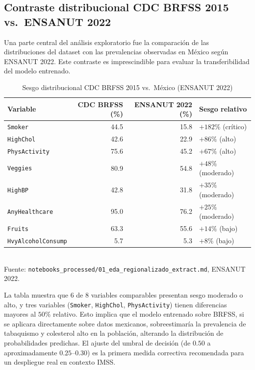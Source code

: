 \documentclass[12pt,a4paper]{article}
\begin{document}
\subsection{Contraste distribucional CDC BRFSS 2015 vs.\ ENSANUT 2022}

Una parte central del análisis exploratorio fue la comparación de las distribuciones del dataset con las prevalencias observadas en México según ENSANUT 2022. Este contraste es imprescindible para evaluar la transferibilidad del modelo entrenado.

\begin{table}[H]
  \centering
  \caption{Sesgo distribucional CDC BRFSS 2015 vs.\ México (ENSANUT 2022)}
  \label{tab:sesgo}
  \begin{tabular}{lrrl}
    \toprule
    \textbf{Variable} & \textbf{CDC BRFSS (\%)} & \textbf{ENSANUT 2022 (\%)} & \textbf{Sesgo relativo}\\
    \midrule
    \texttt{Smoker} & 44.5 & 15.8 & \textcolor{rojoAlerta}{$+182\%$ (crítico)}\\
    \texttt{HighChol} & 42.6 & 22.9 & \textcolor{rojoAlerta}{$+86\%$ (alto)}\\
    \texttt{PhysActivity} & 75.6 & 45.2 & \textcolor{rojoAlerta}{$+67\%$ (alto)}\\
    \texttt{Veggies} & 80.9 & 54.8 & $+48\%$ (moderado)\\
    \texttt{HighBP} & 42.8 & 31.8 & $+35\%$ (moderado)\\
    \texttt{AnyHealthcare} & 95.0 & 76.2 & $+25\%$ (moderado)\\
    \texttt{Fruits} & 63.3 & 55.6 & $+14\%$ (bajo)\\
    \texttt{HvyAlcoholConsump} & 5.7 & 5.3 & $+8\%$ (bajo)\\
    \bottomrule
  \end{tabular}
  \smallskip\\
  \footnotesize Fuente: \texttt{notebooks\_processed/01\_eda\_regionalizado\_extract.md}, ENSANUT 2022.
\end{table}

La tabla muestra que $6$ de $8$ variables comparables presentan sesgo moderado o alto, y tres variables (\texttt{Smoker}, \texttt{HighChol}, \texttt{PhysActivity}) tienen diferencias mayores al $50\%$ relativo. Esto implica que el modelo entrenado sobre BRFSS, si se aplicara directamente sobre datos mexicanos, sobreestimaría la prevalencia de tabaquismo y colesterol alto en la población, alterando la distribución de probabilidades predichas. El ajuste del umbral de decisión (de $0.50$ a aproximadamente $0.25$--$0.30$) es la primera medida correctiva recomendada para un despliegue real en contexto IMSS.
\end{document}
